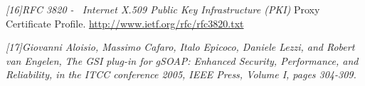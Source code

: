 \documentclass{article}
\newcommand\textstyleCitation[1]{\textit{#1}}
\begin{document}
\textstyleCitation{\textup{[16]RFC 3820 - \ Internet X.509 Public Key
Infrastructure (PKI)}} Proxy Certificate Profile.
\url{http://www.ietf.org/rfc/rfc3820.txt}

\textstyleCitation{\textup{[17]}}\textstyleCitation{\textup{Giovanni
Aloisio, Massimo Cafaro, Italo Epicoco, Daniele Lezzi, and Robert van
Engelen, }}\textstyleCitation{The GSI plug-in for gSOAP: Enhanced
Security, Performance, and Reliability}\textstyleCitation{\textup{, in
the ITCC conference 2005, IEEE Press, Volume I, pages 304-309.}}


\bigskip


\bigskip


\bigskip


\bigskip


\bigskip
\end{document}
